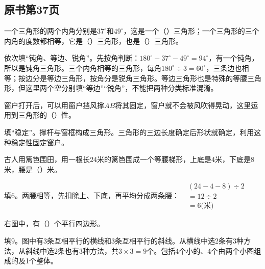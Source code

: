 

\subsection*{原书第37页}

一个三角形的两个内角分别是\(37^\circ\)和\(49^\circ\)，这是一个（\hspace{1.8em}）三角形；一个三角形的三个内角的度数都相等，它是（\hspace{1.8em}）三角形，也是（\hspace{1.8em}）三角形。\par
\begin{BookAnswer}
依次填“钝角、等边、锐角”。先按角判断：\(180^\circ-37^\circ-49^\circ=94^\circ\)，有一个钝角，所以是钝角三角形。三个内角相等的三角形，每角\(180^\circ\div3=60^\circ\)，三条边也相等；按边分是等边三角形，按角分是锐角三角形。等边三角形也是特殊的等腰三角形，但这里两个空分别填“等边”“锐角”，不能把两种分类标准混淆。
\end{BookAnswer}

窗户打开后，可以用窗户挡风撑\(AB\)将其固定，窗户就不会被风吹得晃动，这里运用到三角形的（\hspace{1.8em}）性。\par
{}
\begin{BookAnswer}
填“稳定”。撑杆与窗框构成三角形。三角形的三边长度确定后形状就确定，利用这种稳定性固定窗户。
\end{BookAnswer}

古人用篱笆围田，用一根长24米的篱笆围成一个等腰梯形，上底是4米，下底是8米，腰是（\hspace{1.8em}）米。\par
\begin{BookAnswer}
填\(6\)。两腰相等，先扣除上、下底，再平均分成两条腰：\(\begin{aligned}&(24-4-8)\div2\\&=12\div2\\&=6\text{(米)}\end{aligned}\)
\end{BookAnswer}

右图中，有（\hspace{1.8em}）个平行四边形。\par
{}
\begin{BookAnswer}
填\(9\)。图中有3条互相平行的横线和3条互相平行的斜线。从横线中选2条有3种方法，从斜线中选2条也有3种方法，共\(3\times3=9\)个。包括4个小的、4个由两个小图组成的及1个整体。
\end{BookAnswer}

